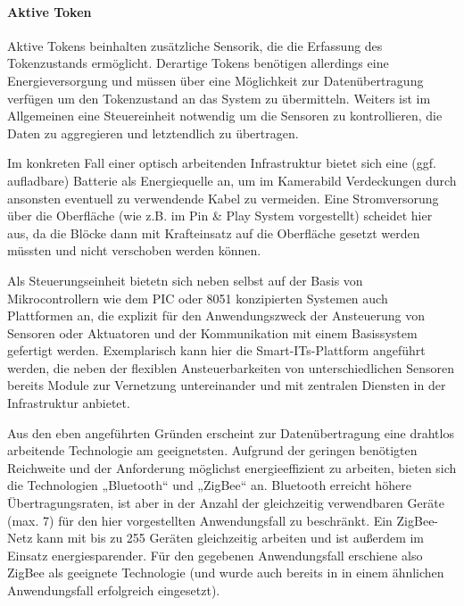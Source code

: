 
\paragraph{Aktive Token} %
\label{par:aktive_token}

Aktive Tokens beinhalten zusätzliche Sensorik, die die Erfassung des Tokenzustands ermöglicht. Derartige Tokens benötigen allerdings eine Energieversorgung und müssen über eine Möglichkeit zur Datenübertragung verfügen um den Tokenzustand an das System zu übermitteln. Weiters ist im Allgemeinen eine Steuereinheit notwendig um die Sensoren zu kontrollieren, die Daten zu aggregieren und letztendlich zu übertragen.

Im konkreten Fall einer optisch arbeitenden Infrastruktur bietet sich eine (ggf. aufladbare) Batterie als Energiequelle an, um im Kamerabild Verdeckungen durch ansonsten eventuell zu verwendende Kabel zu vermeiden. Eine Stromversorung über die Oberfläche (wie z.B. im Pin \& Play System \citep{Van-Laerhoven03} vorgestellt) scheidet hier aus, da die Blöcke dann mit Krafteinsatz auf die Oberfläche gesetzt werden müssten und nicht verschoben werden können. 

Als Steuerungseinheit bietetn sich neben selbst auf der Basis von Mikrocontrollern wie dem PIC oder 8051 \citep{James97} konzipierten Systemen auch Plattformen an, die explizit für den Anwendungszweck der Ansteuerung von Sensoren oder Aktuatoren und der Kommunikation mit einem Basissystem gefertigt werden. Exemplarisch kann hier die Smart-ITs-Plattform \citep{Gellersen04} angeführt werden, die neben der flexiblen Ansteuerbarkeiten von unterschiedlichen Sensoren bereits Module zur Vernetzung untereinander und mit zentralen Diensten in der Infrastruktur anbietet.

Aus den eben angeführten Gründen erscheint zur Datenübertragung eine drahtlos arbeitende Technologie am geeignetsten. Aufgrund der geringen benötigten Reichweite und der Anforderung möglichst energieeffizient zu arbeiten, bieten sich die Technologien „Bluetooth“ \citep{Bluetooth-SIG07} und „ZigBee“ \citep{ZigBee07} an. Bluetooth erreicht höhere Übertragungsraten, ist aber in der Anzahl der gleichzeitig verwendbaren Geräte (max. 7) für den hier vorgestellten Anwendungsfall zu beschränkt. Ein ZigBee-Netz kann mit bis zu 255 Geräten gleichzeitig arbeiten und ist außerdem im Einsatz energiesparender. Für den gegebenen Anwendungsfall erschiene also ZigBee als geeignete Technologie (und wurde auch bereits in \citep{Ferscha08} in einem ähnlichen Anwendungsfall erfolgreich eingesetzt).

